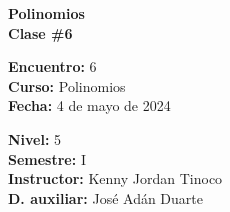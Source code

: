 \begin{center} \textbf
{
    \Large Polinomios \\ \vspace{2mm}Clase \#6
}
\end{center}

\begin{multicols}{2}
{
    \textbf{Encuentro:} 6\\
    \textbf{Curso:} Polinomios\\
    \textbf{Fecha:} 4 de mayo de 2024\\
    \begin{flushright}
        \textbf{Nivel:} 5\\
        \textbf{Semestre:} I\\
        \textbf{Instructor:} Kenny Jordan Tinoco\\
        \textbf{D. auxiliar: }José Adán Duarte
    \end{flushright}
}
\end{multicols}

\thispagestyle{first-page-style}